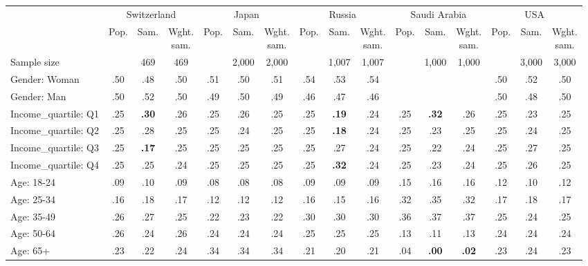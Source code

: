 
\begin{tabular}[t]{lccccccccccccccc}
\toprule
\multicolumn{1}{c}{} & \multicolumn{3}{c}{Switzerland} & \multicolumn{3}{c}{Japan} & \multicolumn{3}{c}{Russia} & \multicolumn{3}{c}{Saudi Arabia} & \multicolumn{3}{c}{USA} \\
\cmidrule(l{3pt}r{3pt}){2-4} \cmidrule(l{3pt}r{3pt}){5-7} \cmidrule(l{3pt}r{3pt}){8-10} \cmidrule(l{3pt}r{3pt}){11-13} \cmidrule(l{3pt}r{3pt}){14-16}
  & Pop. & Sam. & \makecell{Wght.\\sam.} & Pop. & Sam. & \makecell{Wght.\\sam.} & Pop. & Sam. & \makecell{Wght.\\sam.} & Pop. & Sam. & \makecell{Wght.\\sam.} & Pop. & Sam. & \makecell{Wght.\\sam.}\\
\midrule
Sample size &  & 469 & 469 &  & 2,000 & 2,000 &  & 1,007 & 1,007 &  & 1,000 & 1,000 &  & 3,000 & 3,000\\
\addlinespace
Gender: Woman & .50 & .48 & .50 & .51 & .50 & .51 & .54 & .53 & .54 &  &  &  & .50 & .52 & .50\\
Gender: Man & .50 & .52 & .50 & .49 & .50 & .49 & .46 & .47 & .46 &  &  &  & .50 & .48 & .50\\
\addlinespace
Income\_quartile: Q1 & .25 & \textbf{.30} & .26 & .25 & .26 & .25 & .25 & \textbf{.19} & .24 & .25 & \textbf{.32} & .26 & .25 & .23 & .25\\
Income\_quartile: Q2 & .25 & .28 & .25 & .25 & .24 & .25 & .25 & \textbf{.18} & .24 & .25 & .23 & .25 & .25 & .24 & .25\\
Income\_quartile: Q3 & .25 & \textbf{.17} & .25 & .25 & .25 & .25 & .25 & .27 & .24 & .25 & .22 & .24 & .25 & .27 & .25\\
Income\_quartile: Q4 & .25 & .25 & .24 & .25 & .25 & .25 & .25 & \textbf{.32} & .24 & .25 & .23 & .24 & .25 & .26 & .25\\
\addlinespace
Age: 18-24 & .09 & .10 & .09 & .08 & .08 & .08 & .09 & .09 & .09 & .15 & .16 & .16 & .12 & .10 & .12\\
Age: 25-34 & .16 & .18 & .17 & .12 & .12 & .12 & .16 & .15 & .16 & .32 & .35 & .32 & .17 & .18 & .17\\
Age: 35-49 & .26 & .27 & .25 & .22 & .23 & .22 & .30 & .30 & .30 & .36 & .37 & .37 & .25 & .24 & .25\\
Age: 50-64 & .26 & .24 & .26 & .24 & .24 & .24 & .25 & .25 & .25 & .13 & .11 & .13 & .24 & .24 & .24\\
Age: 65+ & .23 & .22 & .24 & .34 & .34 & .34 & .21 & .20 & .21 & .04 & \textbf{.00} & \textbf{.02} & .23 & .24 & .23\\

\end{tabular}
